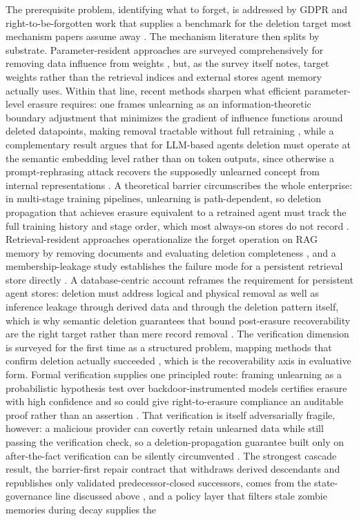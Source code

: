 The prerequisite problem, identifying what to forget, is addressed by GDPR and right-to-be-forgotten work that supplies a benchmark for the deletion target most mechanism papers assume away \citep{staufer2025whatshouldllmsforget}. The mechanism literature then splits by substrate. Parameter-resident approaches are surveyed comprehensively for removing data influence from weights \citep{nguyen2024machineunlearningsurvey}, but, as the survey itself notes, target weights rather than the retrieval indices and external stores agent memory actually uses. Within that line, recent methods sharpen what efficient parameter-level erasure requires: one frames unlearning as an information-theoretic boundary adjustment that minimizes the gradient of influence functions around deleted datapoints, making removal tractable without full retraining \citep{foster2024information}, while a complementary result argues that for LLM-based agents deletion must operate at the semantic embedding level rather than on token outputs, since otherwise a prompt-rephrasing attack recovers the supposedly unlearned concept from internal representations \citep{spohn2025align}. A theoretical barrier circumscribes the whole enterprise: in multi-stage training pipelines, unlearning is path-dependent, so deletion propagation that achieves erasure equivalent to a retrained agent must track the full training history and stage order, which most always-on stores do not record \citep{yu2025impossibility}. Retrieval-resident approaches operationalize the forget operation on RAG memory by removing documents and evaluating deletion completeness \citep{wang2024unlearningmeetsrag}, and a membership-leakage study establishes the failure mode for a persistent retrieval store directly \citep{anderson2024ismydata}. A database-centric account reframes the requirement for persistent agent stores: deletion must address logical and physical removal as well as inference leakage through derived data and through the deletion pattern itself, which is why semantic deletion guarantees that bound post-erasure recoverability are the right target rather than mere record removal \citep{chakraborty2026deletion}. The verification dimension is surveyed for the first time as a structured problem, mapping methods that confirm deletion actually succeeded \citep{xue2025unlearningverificationsurvey}, which is the recoverability axis in evaluative form. Formal verification supplies one principled route: framing unlearning as a probabilistic hypothesis test over backdoor-instrumented models certifies erasure with high confidence and so could give right-to-erasure compliance an auditable proof rather than an assertion \citep{sommer2020probabilistic}. That verification is itself adversarially fragile, however: a malicious provider can covertly retain unlearned data while still passing the verification check, so a deletion-propagation guarantee built only on after-the-fact verification can be silently circumvented \citep{zhang2024fragile}. The strongest cascade result, the barrier-first repair contract that withdraws derived descendants and republishes only validated predecessor-closed successors, comes from the state-governance line discussed above \citep{zhao2026memorepair}, and a policy layer that filters stale zombie memories during decay supplies the 